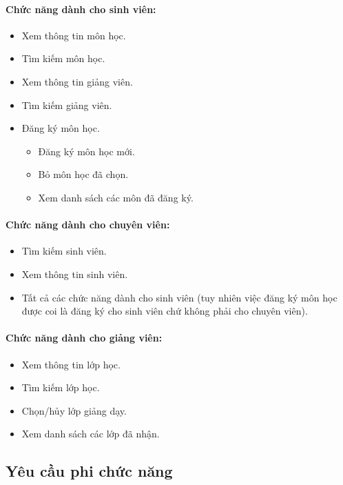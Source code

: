 \documentclass{article}
\begin{document}
    \paragraph{Chức năng dành cho sinh viên:}
    \begin{itemize}
      \item Xem thông tin môn học.
      \item Tìm kiếm môn học.
      \item Xem thông tin giảng viên.
      \item Tìm kiếm giảng viên.
      \item Đăng ký môn học.
      \begin{itemize}
        \item Đăng ký môn học mới.
        \item Bỏ môn học đã chọn.
        \item Xem danh sách các môn đã đăng ký.
      \end{itemize}
    \end{itemize}

    \paragraph{Chức năng dành cho chuyên viên:}
    \begin{itemize}
      \item Tìm kiếm sinh viên.
      \item Xem thông tin sinh viên.
      \item Tất cả các chức năng dành cho sinh viên (tuy nhiên việc đăng ký môn học được coi là đăng ký cho sinh viên chứ không phải cho chuyên viên).
    \end{itemize}

    \paragraph{Chức năng dành cho giảng viên:}
    \begin{itemize}
      \item Xem thông tin lớp học.
      \item Tìm kiếm lớp học.
      \item Chọn/hủy lớp giảng dạy.
      \item Xem danh sách các lớp đã nhận.
    \end{itemize}

  \subsection{Yêu cầu phi chức năng}
\end{document}
